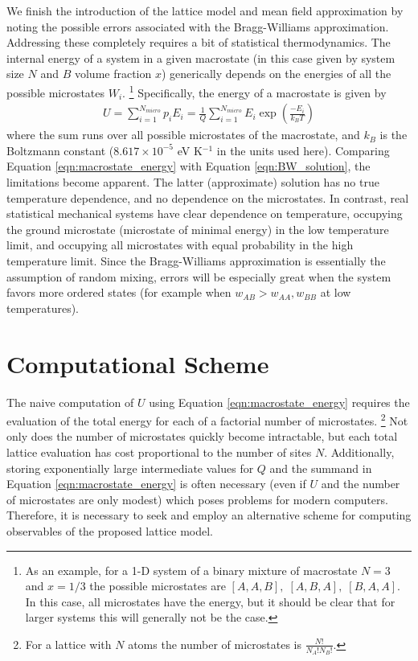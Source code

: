 \documentclass[10pt]{article}
\begin{document}
We finish the introduction of the lattice model and mean field approximation by noting the possible errors associated with the Bragg-Williams approximation.
Addressing these completely requires a bit of statistical thermodynamics.
The internal energy of a system in a given macrostate (in this case given by system size $N$ and $B$ volume fraction $x$) generically depends on the energies of all the possible microstates $W_i$. \footnote{As an example, for a 1-D system of a binary mixture of macrostate $N=3$ and $x=1/3$ the possible microstates are $[A,A,B],\; [A,B,A],\; [B,A,A]$. In this case, all microstates have the energy, but it should be clear that for larger systems this will generally not be the case.}
Specifically, the energy of a macrostate is given by
\begin{align}
    U = \sum_{i=1}^{N_{micro}} p_i E_i
    = \frac{1}{Q} \sum_{i=1}^{N_{micro}} E_i \exp\left(\frac{-E_i}{k_B T}\right)
    \label{eqn:macrostate_energy}
\end{align}
where the sum runs over all possible microstates of the macrostate, and $k_B$ is the Boltzmann constant ($8.617 \times 10^{-5}$ eV K$^{-1}$ in the units used here).
Comparing Equation \ref{eqn:macrostate_energy} with Equation \ref{eqn:BW_solution}, the limitations become apparent.
The latter (approximate) solution has no true temperature dependence, and no dependence on the microstates.
In contrast, real statistical mechanical systems have clear dependence on temperature, occupying the ground microstate (microstate of minimal energy) in the low temperature limit, and occupying all microstates with equal probability in the high temperature limit.
Since the Bragg-Williams approximation is essentially the assumption of random mixing, errors will be especially great when the system favors more ordered states (for example when $w_{AB}>w_{AA},w_{BB}$ at low temperatures).



\section{Computational Scheme}

The naive computation of $U$ using Equation \ref{eqn:macrostate_energy} requires the evaluation of the total energy for each of a factorial number of microstates. \footnote{For a lattice with $N$ atoms the number of microstates is $\frac{N!}{N_A!N_B!}$.}
Not only does the number of microstates quickly become intractable, but each total lattice evaluation has cost proportional to the number of sites $N$. 
Additionally, storing exponentially large intermediate values for $Q$ and the summand in Equation \ref{eqn:macrostate_energy} is often necessary (even if $U$ and the number of microstates are only modest) which poses problems for modern computers.
Therefore, it is necessary to seek and employ an alternative scheme for computing observables of the proposed lattice model.
\end{document}
